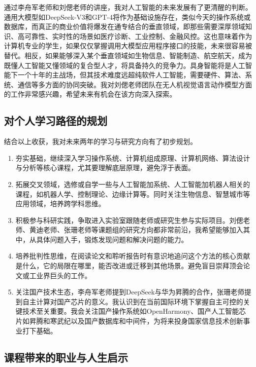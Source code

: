 \documentclass[zihao=-4, linespread=1.5]{ctexart}
\begin{document}
通过李舟军老师和刘偲老师的讲座，我对人工智能的未来发展有了更清醒的判断。通用大模型如DeepSeek-V3和GPT-4将作为基础设施存在，类似今天的操作系统或数据库，而真正的商业价值将爆发在通专结合的垂直领域，即那些需要深厚领域知识、高可靠性、实时性的场景如医疗诊断、工业控制、金融风控。这也意味着作为计算机专业的学生，如果仅仅掌握调用大模型应用程序接口的技能，未来很容易被替代。相反，如果能够深入某个垂直领域如生物信息、智能制造、航空航天，成为既懂人工智能又懂领域的复合型人才，将具备持久的竞争力。具身智能将是人工智能下一个十年的主战场，但其技术难度远超纯软件人工智能，需要硬件、算法、系统、通信等多方面的协同突破。我对刘偲老师团队在无人机视觉语言动作模型方面的工作非常感兴趣，希望未来有机会在该方向深入探索。

\subsection{对个人学习路径的规划}

结合以上收获，我对未来两年的学习与研究方向有了初步规划。
\begin{enumerate}
\item 夯实基础，继续深入学习操作系统、计算机组成原理、计算机网络、算法设计与分析等核心课程，尤其要理解底层原理，避免浮于表面。

\item 拓展交叉领域，选修或自学一些与人工智能加系统、人工智能加机器人相关的课程，如机器人学、控制理论、边缘计算等。同时关注生物信息、智慧城市等应用领域，培养跨学科思维。

\item 积极参与科研实践，争取进入实验室跟随老师或研究生参与实际项目。刘偲老师、黄迪老师、张珊老师等课题组的研究方向都非常前沿，我希望能够加入其中，从具体问题入手，锻炼发现问题和解决问题的能力。

\item 培养批判性思维，在阅读论文和聆听报告时有意识地追问这个方法的核心贡献是什么，它的局限在哪里，能否改进或迁移到其他场景。避免盲目崇拜顶会论文或工业界巨头的工作。

\item 关注国产技术生态，李舟军老师提到DeepSeek与华为昇腾的合作，张珊老师提到自主计算对国产芯片的意义。我认识到在当前国际环境下掌握自主可控的关键技术至关重要。我会关注国产操作系统如OpenHarmony、国产人工智能芯片如昇腾和寒武纪以及国产数据库和中间件，为将来投身国家信息技术创新事业打下基础。

\end{enumerate}
\subsection{课程带来的职业与人生启示}
\end{document}
